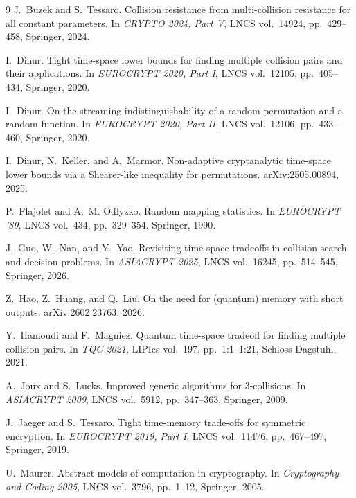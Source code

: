 \documentclass[11pt]{article}
\theoremstyle{plain}
\theoremstyle{definition}
\begin{document}
\begin{thebibliography}{9}
J.~Buzek and S.~Tessaro.
\newblock Collision resistance from multi-collision resistance for all
  constant parameters.
\newblock In \emph{CRYPTO 2024, Part V}, LNCS vol.~14924, pp.~429--458,
  Springer, 2024.

I.~Dinur.
\newblock Tight time-space lower bounds for finding multiple collision
  pairs and their applications.
\newblock In \emph{EUROCRYPT 2020, Part I}, LNCS vol.~12105,
  pp.~405--434, Springer, 2020.

I.~Dinur.
\newblock On the streaming indistinguishability of a random permutation and
  a random function.
\newblock In \emph{EUROCRYPT 2020, Part II}, LNCS vol.~12106,
  pp.~433--460, Springer, 2020.

I.~Dinur, N.~Keller, and A.~Marmor.
\newblock Non-adaptive cryptanalytic time-space lower bounds via a
  Shearer-like inequality for permutations.
\newblock arXiv:2505.00894, 2025.

P.~Flajolet and A.~M. Odlyzko.
\newblock Random mapping statistics.
\newblock In \emph{EUROCRYPT '89}, LNCS vol.~434, pp.~329--354, Springer,
  1990.

J.~Guo, W.~Nan, and Y.~Yao.
\newblock Revisiting time-space tradeoffs in collision search and decision
  problems.
\newblock In \emph{ASIACRYPT 2025}, LNCS vol.~16245, pp.~514--545,
  Springer, 2026.

Z.~Hao, Z.~Huang, and Q.~Liu.
\newblock On the need for (quantum) memory with short outputs.
\newblock arXiv:2602.23763, 2026.

Y.~Hamoudi and F.~Magniez.
\newblock Quantum time-space tradeoff for finding multiple collision
  pairs.
\newblock In \emph{TQC 2021}, LIPIcs vol.~197, pp.~1:1--1:21, Schloss
  Dagstuhl, 2021.

A.~Joux and S.~Lucks.
\newblock Improved generic algorithms for 3-collisions.
\newblock In \emph{ASIACRYPT 2009}, LNCS vol.~5912, pp.~347--363,
  Springer, 2009.

J.~Jaeger and S.~Tessaro.
\newblock Tight time-memory trade-offs for symmetric encryption.
\newblock In \emph{EUROCRYPT 2019, Part I}, LNCS vol.~11476,
  pp.~467--497, Springer, 2019.

U.~Maurer.
\newblock Abstract models of computation in cryptography.
\newblock In \emph{Cryptography and Coding 2005}, LNCS vol.~3796,
  pp.~1--12, Springer, 2005.


\end{thebibliography}
\end{document}
